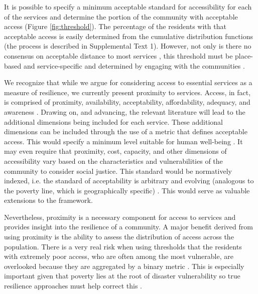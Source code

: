 \documentclass[9pt,twocolumn,twoside,lineno]{pnas-new}
\begin{document}
It is possible to specify a minimum acceptable standard for accessibility for each of the services and determine the portion of the community with acceptable access (Figure \ref{fig:threshold}). 
The percentage of the residents with that acceptable access is easily determined from the cumulative distribution functions (the process is described in Supplemental Text 1). 
However, not only is there no consensus on acceptable distance to most services \cite{Dempsey2008-hr}, this threshold must be place-based and service-specific and determined by engaging with the communities \cite{Pantelic1991-qu}.

We recognize that while we argue for considering access to essential services as a measure of resilience, we  currently present proximity to services. 
Access, in fact, is comprised of proximity, availability, acceptability, affordability, adequacy, and awareness \cite{Saurman2016-gj, Penchansky1981-qh}. 
Drawing on, and advancing, the relevant literature will lead to the additional dimensions being included for each service. 
These additional dimensions can be included through the use of a metric that defines acceptable access. 
This would specify a minimum level suitable for human well-being \cite{Doorn2018-fx}.
It may even require that proximity, cost, capacity, and other dimensions of accessibility vary based on the characteristics and vulnerabilities of the community to consider social justice.
This standard would be normatively indexed, i.e. the standard of acceptability is arbitrary and evolving (analogous to the poverty line, which is geographically specific) \cite{Constas2014-ui}.
This would serve as valuable extensions to the framework.

Nevertheless, proximity is a necessary component for access to services and provides insight into the resilience of a community. 
A major benefit derived from using proximity is the ability to assess the distribution of access across the population. 
There is a very real risk when using thresholds that the residents with extremely poor access, who are often among the most vulnerable, are overlooked because they are aggregated by a binary metric \cite{Logan2017-fr}. 
This is especially important given that poverty lies at the root of disaster vulnerability so true resilience approaches must help correct this \cite{Pantelic1991-qu}.

\end{document}
